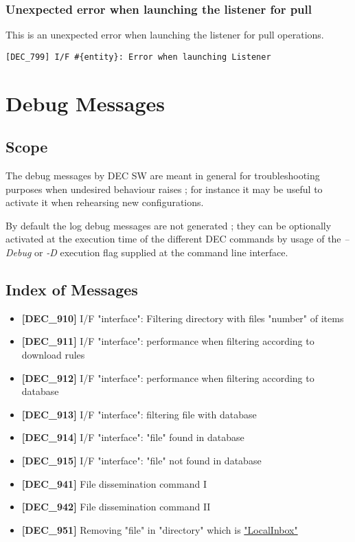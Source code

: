 \documentclass[dec_sum_main.tex]{subfiles}
\begin{document}
\subsubsection{Unexpected error when launching the listener for pull}
This is an unexpected error when launching the listener for pull operations.
\begin{verbatim}
[DEC_799] I/F #{entity}: Error when launching Listener
\end{verbatim}

\newpage
\section{Debug Messages}

\subsection{Scope}
The debug messages by DEC SW are meant in general for troubleshooting purposes when undesired behaviour raises ; for instance it may be useful to activate it when rehearsing new configurations. \newline

\par
\noindent
By default the log debug messages are not generated ; they can be optionally activated at the execution time of the different DEC commands by usage of the \textit{--Debug} or \textit{-D} execution flag supplied at the command line interface.


\subsection{Index of Messages}

\begin{itemize}
	\item \textbf{[DEC\_910]} I/F "interface": Filtering directory with files "number" of items
	\item \textbf{[DEC\_911]} I/F "interface": performance when filtering according to download rules 
	\item \textbf{[DEC\_912]} I/F "interface": performance when filtering according to database
	\item \textbf{[DEC\_913]} I/F "interface": filtering file with database
	\item \textbf{[DEC\_914]} I/F "interface": "file" found in database
	\item \textbf{[DEC\_915]} I/F "interface": "file" not found in database	
	\item \textbf{[DEC\_941]} File dissemination command I
	\item \textbf{[DEC\_942]} File dissemination command II	
	\item \textbf{[DEC\_951]} Removing "file" in "directory" which is \hyperref[LocalInbox]{"LocalInbox"}
\end{itemize}
\end{document}
